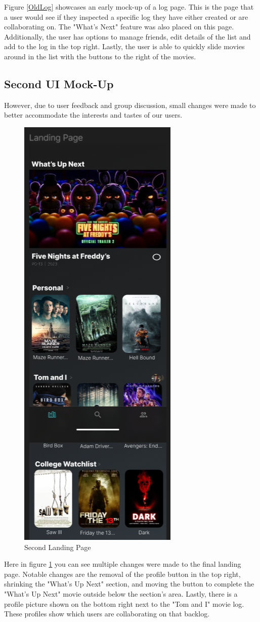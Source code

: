 \documentclass[12pt,asmart]{report}
\begin{document}
Figure \ref{OldLog} showcases an early mock-up of a log page. This is the page that a user would see if they inspected a specific log they have either created or are collaborating on. The "What's Next" feature was also placed on this page. Additionally, the user has options to manage friends, edit details of the list and add to the log in the top right. Lastly, the user is able to quickly slide movies around in the list with the buttons to the right of the movies.
\subsection{Second UI Mock-Up}
However, due to user feedback and group discussion, small changes were made to better accommodate the interests and tastes of our users.
\begin{figure}[H]
    \centering
    \includegraphics[width=0.4\linewidth]{LandingPage.png}
    \caption{Second Landing Page}
    \label{JoshLanding}
\end{figure}
Here in figure \ref{JoshLanding} you can see multiple changes were made to the final landing page. Notable changes are the removal of the profile button in the top right, shrinking the "What's Up Next" section, and moving the button to complete the "What's Up Next" movie outside below the section's area. Lastly, there is a profile picture shown on the bottom right next to the "Tom and I" movie log. These profiles show which users are collaborating on that backlog.
\end{document}
